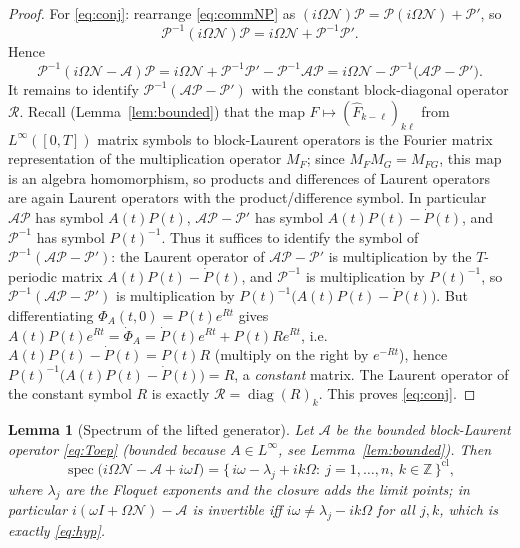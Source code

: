 \documentclass{amsart}
\newtheorem{lemma}{Lemma}
\theoremstyle{definition}
\DeclareMathOperator{\spec}{spec}
\DeclareMathOperator{\diag}{diag}
\newcommand{\Z}{\mathbb{Z}}
\newcommand{\Acal}{\mathcal{A}}
\newcommand{\Ncal}{\mathcal{N}}
\begin{document}
\begin{proof}
For \eqref{eq:conj}: rearrange \eqref{eq:commNP} as
$(i\Omega\Ncal)\mathcal P=\mathcal P(i\Omega\Ncal)+\mathcal P'$, so
\[
\mathcal P^{-1}(i\Omega\Ncal)\mathcal P
=i\Omega\Ncal+\mathcal P^{-1}\mathcal P' .
\]
Hence
\[
\mathcal P^{-1}(i\Omega\Ncal-\Acal)\mathcal P
=i\Omega\Ncal+\mathcal P^{-1}\mathcal P'-\mathcal P^{-1}\Acal\mathcal P
=i\Omega\Ncal-\mathcal P^{-1}\big(\Acal\mathcal P-\mathcal P'\big).
\]
It remains to identify $\mathcal P^{-1}(\Acal\mathcal P-\mathcal P')$ with the
constant block-diagonal operator $\mathcal R$. Recall (Lemma~\ref{lem:bounded})
that the map $F\mapsto(\hat F_{k-\ell})_{k\ell}$ from $L^\infty([0,T])$ matrix
symbols to block-Laurent operators is the Fourier matrix representation of the
multiplication operator $M_F$; since $M_F M_G=M_{FG}$, this map is an algebra
homomorphism, so products and differences of Laurent operators are again Laurent
operators with the product/difference symbol. In particular $\Acal\mathcal P$ has
symbol $A(t)P(t)$, $\Acal\mathcal P-\mathcal P'$ has symbol $A(t)P(t)-\dot P(t)$,
and $\mathcal P^{-1}$ has symbol $P(t)^{-1}$. Thus it suffices to identify the
symbol of $\mathcal P^{-1}(\Acal\mathcal P-\mathcal P')$: the
Laurent operator of $\Acal\mathcal P-\mathcal P'$ is multiplication by the
$T$-periodic matrix $A(t)P(t)-\dot P(t)$, and $\mathcal P^{-1}$ is multiplication
by $P(t)^{-1}$, so $\mathcal P^{-1}(\Acal\mathcal P-\mathcal P')$ is multiplication
by $P(t)^{-1}\big(A(t)P(t)-\dot P(t)\big)$. But differentiating
$\Phi_A(t,0)=P(t)e^{Rt}$ gives
$A(t)P(t)e^{Rt}=\dot\Phi_A=\dot P(t)e^{Rt}+P(t)Re^{Rt}$, i.e.
$A(t)P(t)-\dot P(t)=P(t)R$ (multiply on the right by $e^{-Rt}$), hence
$P(t)^{-1}\big(A(t)P(t)-\dot P(t)\big)=R$, a \emph{constant} matrix. The Laurent
operator of the constant symbol $R$ is exactly $\mathcal R=\diag(R)_k$. This
proves \eqref{eq:conj}.
\end{proof}

\begin{lemma}[Spectrum of the lifted generator]\label{lem:spectrum}
Let $\Acal$ be the bounded block-Laurent operator \eqref{eq:Toep} (bounded
because $A\in L^\infty$, see Lemma~\ref{lem:bounded}). Then
\begin{equation}\label{eq:specG}
\spec\!\big(i\Omega\Ncal-\Acal+i\omega I\big)
=\big\{\,i\omega-\lambda_j+i k\Omega:\ j=1,\dots,n,\ k\in\Z\,\big\}^{\mathrm{cl}},
\end{equation}
where $\lambda_j$ are the Floquet exponents and the closure adds the limit
points; in particular $i(\omega I+\Omega\Ncal)-\Acal$ is invertible iff
$i\omega\ne\lambda_j-ik\Omega$ for all $j,k$, which is exactly \eqref{eq:hyp}.
\end{lemma}
\end{document}
